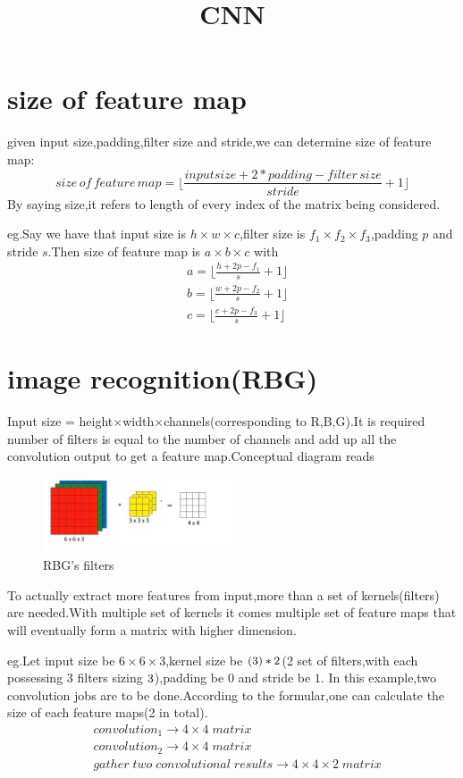\documentclass{article}
\begin{document}
\title{CNN}
\date{ }
\maketitle
\section{size of feature map}
given input size,padding,filter size and stride,we can determine size of feature map:$$size\,of\,feature\,map=\lfloor\frac{inputsize+2*padding-filter\,size}{stride}+1\rfloor $$By saying size,it refers to length of every index of the matrix being considered.
\par eg.Say we have that input size is $h\times w\times c$,filter size is $f_1\times f_2\times f_3$,padding $p$ and stride $s$.Then size of feature map is $a\times b\times c$ with
\begin{align*}
	&a=\lfloor\frac{h+2p-f_1}{s}+1\rfloor\\
	&b=\lfloor\frac{w+2p-f_2}{s}+1\rfloor\\
	&c=\lfloor\frac{c+2p-f_3}{s}+1\rfloor
\end{align*}
\section{image recognition(RBG)}
Input size = height$\times$width$\times$channels(corresponding to R,B,G).It is required number of filters is equal to the number of channels and add up all the convolution output to get a feature map.Conceptual diagram reads
\begin{figure}[htbp]
	\centering
	\includegraphics[width=0.5\textwidth]{1.jpg}
	\caption{RBG's filters}
\end{figure}
To actually extract more features from input,more than a set of kernels(filters) are needed.With multiple set of kernels it comes multiple set of feature maps that will eventually form a matrix with higher dimension.
\par eg.Let input size be $6\times6\times3$,kernel size be $(3\time3\time3)*2$(2 set of filters,with each possessing 3 filters sizing $3\time3$),padding be $0$ and stride be $1$.
In this example,two convolution jobs are to be done.According to the formular,one can calculate the size of each feature maps(2 in total).
\begin{align*}
	&convolution_1\rightarrow4\times4\;matrix\\
	&convolution_2\rightarrow4\times4\;matrix\\
	&gather\;two\;convolutional\;results\rightarrow4\times4\times2\;matrix
\end{align*}
\end{document}

